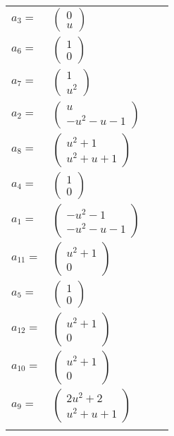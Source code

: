 \documentclass[1p]{elsarticle_modified}
\theoremstyle{definition}
\begin{document}
\begin{tabular}{m{7pt} m{180pt} m{7pt} m{180pt} }
\flushright $a_{3}=$&$\begin{pmatrix}0\\u\end{pmatrix}$ \\
\flushright $a_{6}=$&$\begin{pmatrix}1\\0\end{pmatrix}$ \\
\flushright $a_{7}=$&$\begin{pmatrix}1\\u^2\end{pmatrix}$ \\
\flushright $a_{2}=$&$\begin{pmatrix}u\\- u^2- u-1\end{pmatrix}$ \\
\flushright $a_{8}=$&$\begin{pmatrix}u^2+1\\u^2+u+1\end{pmatrix}$ \\
\flushright $a_{4}=$&$\begin{pmatrix}1\\0\end{pmatrix}$ \\
\flushright $a_{1}=$&$\begin{pmatrix}- u^2-1\\- u^2- u-1\end{pmatrix}$ \\
\flushright $a_{11}=$&$\begin{pmatrix}u^2+1\\0\end{pmatrix}$ \\
\flushright $a_{5}=$&$\begin{pmatrix}1\\0\end{pmatrix}$ \\
\flushright $a_{12}=$&$\begin{pmatrix}u^2+1\\0\end{pmatrix}$ \\
\flushright $a_{10}=$&$\begin{pmatrix}u^2+1\\0\end{pmatrix}$ \\
\flushright $a_{9}=$&$\begin{pmatrix}2 u^2+2\\u^2+u+1\end{pmatrix}$\\&\end{tabular}
\end{document}
